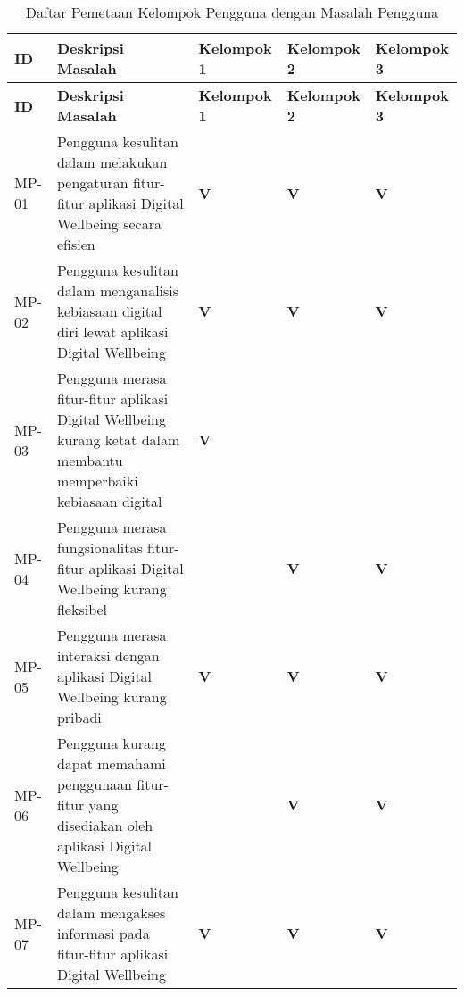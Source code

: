 \RaggedLeft
\begin{small}
\begin{longtable}[c]{|>{\ccnormspacing}m{}|>{\ccnormspacing}m{}|>{\ccnormspacingcenter}m{}|>{\ccnormspacingcenter}m{}|>{\ccnormspacingcenter}m{}|}
  \caption{Daftar Pemetaan Kelompok Pengguna dengan Masalah Pengguna}
  \label{tab:pemetaan_masalah} \\
  \hline \rowcolor[HTML]{A3E5F5}
  \centering\textbf{ID} & \centering\textbf{Deskripsi Masalah} & \textbf{Kelompok 1} & \textbf{Kelompok 2} & \textbf{Kelompok 3} \\ \hline \endfirsthead
  \hline \rowcolor[HTML]{A3E5F5}
  \centering\textbf{ID} & \centering\textbf{Deskripsi Masalah} & \textbf{Kelompok 1} & \textbf{Kelompok 2} & \textbf{Kelompok 3} \\ \hline \endhead

  \hline \endfoot

  \centering MP-01 & Pengguna kesulitan dalam melakukan pengaturan fitur-fitur aplikasi Digital Wellbeing secara efisien & \textbf{V} & \textbf{V} & \textbf{V} \\ \hline
  \centering MP-02 & Pengguna kesulitan dalam menganalisis kebiasaan digital diri lewat aplikasi Digital Wellbeing & \textbf{V} & \textbf{V} & \textbf{V} \\ \hline
  \centering MP-03 & Pengguna merasa fitur-fitur aplikasi Digital Wellbeing kurang ketat dalam membantu memperbaiki kebiasaan digital & \textbf{V} &  &  \\ \hline
  \centering MP-04 & Pengguna merasa fungsionalitas fitur-fitur aplikasi Digital Wellbeing kurang fleksibel &  & \textbf{V} & \textbf{V} \\ \hline
  \centering MP-05 & Pengguna merasa interaksi dengan aplikasi Digital Wellbeing kurang pribadi & \textbf{V} & \textbf{V} & \textbf{V} \\ \hline
  \centering MP-06 & Pengguna kurang dapat memahami penggunaan fitur-fitur yang disediakan oleh aplikasi Digital Wellbeing &  & \textbf{V} & \textbf{V} \\ \hline
  \centering MP-07 & Pengguna kesulitan dalam mengakses informasi pada fitur-fitur aplikasi Digital Wellbeing & \textbf{V} & \textbf{V} & \textbf{V} \\ \hline

\end{longtable}
\end{small}
\justifying
\FloatBarrier

